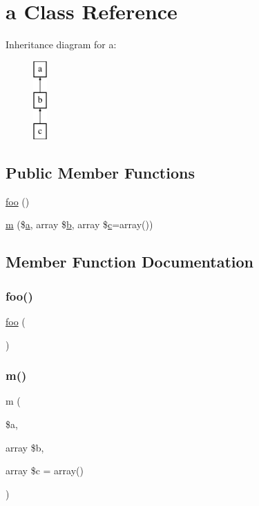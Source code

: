 \hypertarget{interfacea}{}\section{a Class Reference}
\label{interfacea}
Inheritance diagram for a\+:\begin{figure}[H]
\begin{center}
\leavevmode
\includegraphics[height=3.000000cm]{interfacea}
\end{center}
\end{figure}
\subsection*{Public Member Functions}
\begin{DoxyCompactItemize}
\item 
\mbox{\hyperlink{interfacea_a79418a120498dd9cf915655654607747}{foo}} ()
\item 
\mbox{\hyperlink{interfacea_a0fd5ec041a095f0feb67e713f0685716}{m}} (\$\mbox{\hyperlink{interfacea}{a}}, array \$\mbox{\hyperlink{interfaceb}{b}}, array \$\mbox{\hyperlink{classc}{c}}=array())
\end{DoxyCompactItemize}


\subsection{Member Function Documentation}
\mbox{\label{interfacea_a79418a120498dd9cf915655654607747}} 
\subsubsection{\texorpdfstring{foo()}{foo()}}
{\footnotesize\ttfamily \mbox{\hyperlink{interfacefoo}{foo}} (\begin{DoxyParamCaption}{ }\end{DoxyParamCaption})}

\mbox{\label{interfacea_a0fd5ec041a095f0feb67e713f0685716}} 
\subsubsection{\texorpdfstring{m()}{m()}}
{\footnotesize\ttfamily m (\begin{DoxyParamCaption}\item[{}]{\$a,  }\item[{array}]{\$b,  }\item[{array}]{\$c = {\ttfamily array()} }\end{DoxyParamCaption})\hspace{0.3cm}{\ttfamily [abstract]}}



